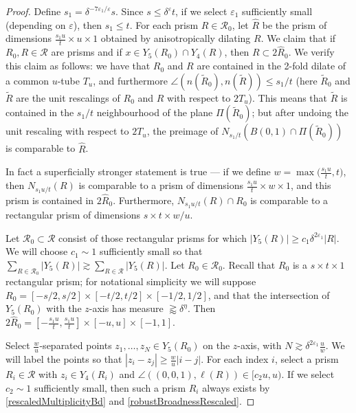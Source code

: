 \documentclass[letterpaper, reqno,11pt]{article}
\numberwithin{equation}{section}
\newcommand{\eps}{\varepsilon}
\numberwithin{thm}{section}
\theoremstyle{remark}
\begin{document}
\begin{proof}

\medskip

Define $s_1 = \delta^{-7\eps_1/\eps}s$. Since $s\leq\delta^\eps t$, if we select $\eps_1$ sufficiently small (depending on $\eps$), then $ s_1\leq  t$.
%
For each prism $R\in \mathcal{R}_0$, let $\hat R$ be the prism of dimensions $ \frac{s_1u}{t}  \times u \times 1$ obtained by anisotropically dilating $R$. We claim that if $R_0,R\in\mathcal{R}$ are prisms and if $x\in Y_5(R_0)\cap Y_4(R)$, then $R\subset 2\hat R_0$. We verify this claim as follows: we have that $R_0$ and $R$ are contained in the 2-fold dilate of a common $u$-tube $T_u$, and furthermore $\angle(n(\tilde R_0), n(\tilde R))\leq s_1/t$ (here $\tilde R_0$ and $\tilde R$ are the unit rescalings of $R_0$ and $R$ with respect to $2T_u$). This means that $\tilde R$ is contained in the $s_1/t$ neighbourhood of the plane $\Pi(\tilde R_0)$; but after undoing the unit rescaling with respect to $2T_u$, the preimage of $N_{s_1/t}(B(0,1)\cap \Pi(\tilde R_0))$ is comparable to $\hat R$. 

In fact a superficially stronger statement is true --- if we define $w=\max\big(\frac{s_1 u}{t},t\big)$, then $N_{s_1 u/t}(R)$ is comparable to a prism of dimensions $\frac{s_1 u}{t}\times w\times 1$, and this prism is contained in $2\hat R_0$. Furthermore, $N_{s_1 u/t}(R)\cap R_0$ is comparable to a rectangular prism of dimensions $s\times t\times w/u$. 


Let $\mathcal{R}_0\subset\mathcal{R}$ consist of those rectangular prisms for which $|Y_5(R)|\geq c_1 \delta^{2\eps_1}|R|$. We will choose $c_1\sim 1$ sufficiently small so that $\sum_{R\in\mathcal{R}_0}|Y_5(R)|\gtrsim \sum_{R\in\mathcal{R}}|Y_5(R)|$. Let $R_0\in\mathcal{R}_0$. Recall that $R_0$ is a $s\times t\times 1$ rectangular prism; for notational simplicity we will suppose $R_0 = [-s/2,s/2]\times[-t/2,t/2]\times [-1/2, 1/2]$, and that the intersection of $Y_5(R_0)$ with the $z$-axis has measure $\gtrapprox\delta^{\eta}$. Then $2\hat R_0= [-\frac{s_1u}{t}, \frac{s_1u}{t}]\times [-u,u]\times[-1,1]$.

Select $\frac{w}{u}$-separated points $z_1,\ldots,z_N\in Y_5(R_0)$ on the $z$-axis, with $N\gtrsim \delta^{2\eps_1}\frac{u}{w}$. We will label the points so that $|z_i-z_j|\geq \frac{w}{u}|i-j|$. For each index $i$, select a prism $R_i\in\mathcal{R}$ with $z_i\in Y_4(R_i)$ and $\angle((0,0,1),\ell(R))\in[c_2u, u)$. If we select $c_2\sim 1$ sufficiently small, then such a prism $R_i$ always exists by \eqref{rescaledMultiplicityBd} and \eqref{robustBroadnessRescaled}.


\end{proof}
\end{document}

